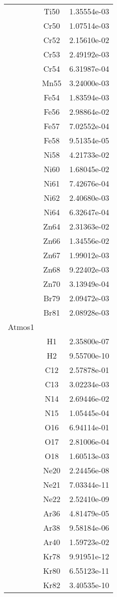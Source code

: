 \begin{centering}
\begin{longtable}{l c c}
& Ti50 & 1.35554e-03 \\ 
& Cr50 & 1.07514e-03 \\ 
& Cr52 & 2.15610e-02 \\ 
& Cr53 & 2.49192e-03 \\ 
& Cr54 & 6.31987e-04 \\ 
& Mn55 & 3.24000e-03 \\ 
& Fe54 & 1.83594e-03 \\ 
& Fe56 & 2.98864e-02 \\ 
& Fe57 & 7.02552e-04 \\ 
& Fe58 & 9.51354e-05 \\ 
& Ni58 & 4.21733e-02 \\ 
& Ni60 & 1.68045e-02 \\ 
& Ni61 & 7.42676e-04 \\ 
& Ni62 & 2.40680e-03 \\ 
& Ni64 & 6.32647e-04 \\ 
& Zn64 & 2.31363e-02 \\ 
& Zn66 & 1.34556e-02 \\ 
& Zn67 & 1.99012e-03 \\ 
& Zn68 & 9.22402e-03 \\ 
& Zn70 & 3.13949e-04 \\ 
& Br79 & 2.09472e-03 \\ 
& Br81 & 2.08928e-03 \\ 
\hline
Atmos1 & & \\
\hline
& H1 & 2.35800e-07 \\ 
& H2 & 9.55700e-10 \\ 
& C12 & 2.57878e-01 \\ 
& C13 & 3.02234e-03 \\ 
& N14 & 2.69446e-02 \\ 
& N15 & 1.05445e-04 \\ 
& O16 & 6.94114e-01 \\ 
& O17 & 2.81006e-04 \\ 
& O18 & 1.60513e-03 \\ 
& Ne20 & 2.24456e-08 \\ 
& Ne21 & 7.03344e-11 \\ 
& Ne22 & 2.52410e-09 \\ 
& Ar36 & 4.81479e-05 \\ 
& Ar38 & 9.58184e-06 \\ 
& Ar40 & 1.59723e-02 \\ 
& Kr78 & 9.91951e-12 \\ 
& Kr80 & 6.55123e-11 \\ 
& Kr82 & 3.40535e-10 \\ 

\end{longtable}
\end{centering}

